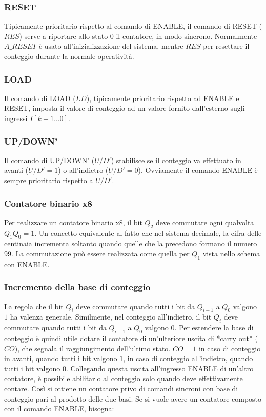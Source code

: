 \documentclass{subfiles}
\begin{document}
\subsubsection{RESET}

Tipicamente prioritario rispetto al comando di ENABLE, il comando di RESET ($RES$) serve a riportare allo stato 0 il contatore, in modo sincrono.
Normalmente $A\_RESET$ è usato all'inizializzazione del sistema, mentre $RES$ per resettare il conteggio durante la normale operatività.

\subsubsection{LOAD}

Il comando di LOAD ($LD$), tipicamente prioritario rispetto ad ENABLE e RESET, imposta il valore di conteggio ad un valore fornito dall'esterno sugli ingressi $I[k-1 \dots 0]$.

\subsubsection{UP/DOWN'}

Il comando di UP/DOWN' ($U/D'$) stabilisce se il conteggio va effettuato in avanti ($U/D'=1$) o all'indietro ($U/D'=0$).
Ovviamente il comando ENABLE è sempre prioritario rispetto a $U/D'$.

\subsubsection{Contatore binario x8}

Per realizzare un contatore binario x8, il bit $Q_2$ deve commutare ogni qualvolta $Q_1Q_0 = 1$.
Un concetto equivalente al fatto che nel sistema decimale, la cifra delle centinaia incrementa soltanto quando quelle che la precedono formano il numero 99.
La commutazione può essere realizzata come quella per $Q_1$ vista nello schema con ENABLE.

\subsubsection{Incremento della base di conteggio}

La regola che il bit $Q_i$ deve commutare quando tutti i bit da $Q_{i-1}$ a $Q_0$ valgono $1$ ha valenza generale.
Similmente, nel conteggio all'indietro, il bit $Q_i$ deve commutare quando tutti i bit da $Q_{i-1}$ a $Q_0$ valgono $0$.
Per estendere la base di conteggio è quindi utile dotare il contatore di un'ulteriore uscita di *carry out* ($CO$), che segnala il raggiungimento dell'ultimo stato.
$CO=1$ in caso di conteggio in avanti, quando tutti i bit valgono $1$, in caso di conteggio all'indietro, quando tutti i bit valgono $0$.
Collegando questa uscita all'ingresso ENABLE di un'altro contatore, è possibile abilitarlo al conteggio solo quando deve effettivamente contare.
Così si ottiene un contatore privo di comandi sincroni con base di conteggio pari al prodotto delle due basi.
Se si vuole avere un contatore composto con il comando ENABLE, bisogna:
\end{document}
